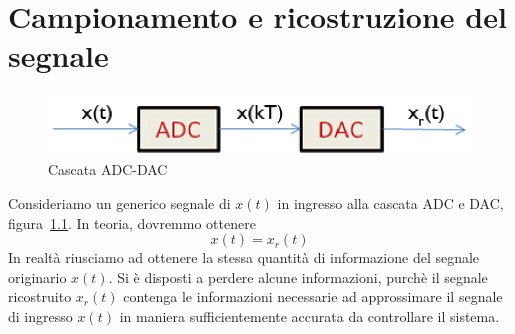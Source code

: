 \documentclass[a4paper]{report}
\begin{document}
\chapter{Campionamento e ricostruzione del segnale}
\begin{figure}[!h]
  \begin{center}
    \includegraphics[scale=0.3]{./figures/campionamentoRicostruizioneSegnale.png}
    \caption{Cascata ADC-DAC}\label{fig:campionamentoRicostruizioneSegnale}
  \end{center}
\end{figure}
Consideriamo un generico segnale di $x(t)$ in ingresso alla cascata
ADC e DAC, figura~\ref{fig:campionamentoRicostruizioneSegnale}. In
teoria, dovremmo ottenere
\[
x(t) = x_r(t)
\]
In realt\`a riusciamo ad ottenere la stessa quantit\`a di informazione
del segnale originario $x(t)$. Si \`e disposti a perdere alcune
informazioni, purch\`e il segnale ricostruito $x_r(t)$ contenga le
informazioni necessarie ad approssimare il segnale di ingresso $x(t)$
in maniera sufficientemente accurata da controllare il sistema.



\begin{figure}[!h]
  \begin{center}
    \caption{}\label{fig:}
  \end{center}
\end{figure}

\appendix
\end{document}

